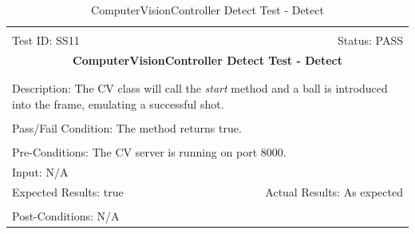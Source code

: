 \documentclass[11pt]{article}
\begin{document}
\begin{center}
\begin{table}[H]
\begin{tabular}{|l r|}\hline&\\[-2mm]
	Test ID: SS11	&Status: PASS\\[-3mm]
	\multicolumn{2}{|c|}{\textbf{\large{ComputerVisionController Detect Test - Detect}}}\\&\\\hline&\\[-3mm]
	\multicolumn{2}{|p{\textwidth}|}{Description: The CV class will call the \textit{start} method and a ball is introduced into the frame, emulating a successful shot.}\\[1mm]\hline&\\[-3mm]
	\multicolumn{2}{|p{\textwidth}|}{Pass/Fail Condition: The method returns true.}\\[1mm]\hline&\\[-3mm]
	\multicolumn{2}{|p{\textwidth}|}{Pre-Conditions: The CV server is running on port 8000.}\\[4mm]
	\multicolumn{2}{|p{\textwidth}|}{Input: N/A}\\[2mm]\hline
	\multicolumn{1}{|p{0.49\textwidth}}{Expected Results: true}	&\multicolumn{1}{|p{0.45\textwidth}|}{Actual Results: As expected}\\\hline&\\[-3mm]
	\multicolumn{2}{|p{\textwidth}|}{Post-Conditions: N/A}\\\hline
\end{tabular}
\caption{ComputerVisionController Detect Test - Detect}
\end{table}
\end{center}
\end{document}
